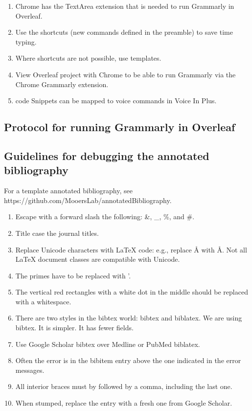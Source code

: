 \documentclass[10pt,letterpaper]{article}
\newcommand{\be}{\begin{enumerate}}
\newcommand{\ee}{\end{enumerate}}
\begin{document}
\be
\item Chrome has the TextArea extension that is needed to run Grammarly in Overleaf.
\item Use the shortcuts (new commands defined in the preamble) to save time typing.
\item Where shortcuts are not possible, use templates.
\item View Overleaf project with Chrome to be able to run Grammarly via the Chrome Grammarly extension.
\item code Snippets can be mapped to voice commands in Voice In Plus.
\ee 


\subsection{Protocol for running Grammarly in Overleaf}
\label{subsec:guides:grammarlyInoverleaf}



\subsection{Guidelines for debugging the annotated bibliography} 
\label{subsec:guides:annotDebug}

For a template annotated bibliography, see https://github.com/MooersLab/annotatedBibliography.

\be
\item Escape with a forward slash the following: \&, \_, \%, and \#. 
\item Title case the journal titles.
\item Replace Unicode characters with LaTeX code: e.g., replace Å with \AA. Not all LaTeX document classes are compatible with Unicode.
\item The primes have to be replaced with '.
\item The vertical red rectangles with a white dot in the middle should be replaced with a whitespace.
\item There are two styles in the bibtex world: bibtex and biblatex. We are using bibtex. It is simpler. It has fewer fields.
\item Use Google Scholar bibtex over Medline or PubMed biblatex. 
\item Often the error is in the bibitem entry above the one indicated in the error messages.
\item All interior braces must by followed by a comma, including the last one.
\item When stumped, replace the entry with a fresh one from Google Scholar.
\ee
\end{document}
